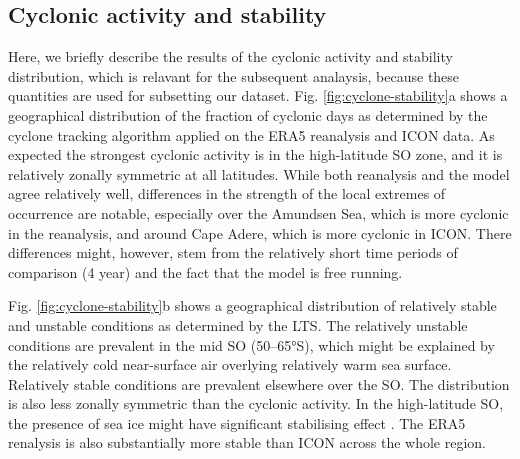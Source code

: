 \documentclass[12pt,a4paper]{article}
\begin{document}
\subsection{Cyclonic activity and stability}

Here, we briefly describe the results of the cyclonic activity and stability
distribution, which is relavant for the subsequent analaysis, because these
quantities are used for subsetting our dataset. Fig.
\ref{fig:cyclone-stability}a shows a geographical distribution of the fraction
of cyclonic days as determined by the cyclone tracking algorithm applied on the
ERA5 reanalysis and ICON data. As expected the strongest cyclonic activity is
in the high-latitude SO zone, and it is relatively zonally symmetric at all
latitudes.  While both reanalysis and the model agree relatively well,
differences in the strength of the local extremes of occurrence are notable,
especially over the Amundsen Sea, which is more cyclonic in the reanalysis, and
around Cape Adere, which is more cyclonic in ICON. There differences might,
however, stem from the relatively short time periods of comparison (4 year) and
the fact that the model is free running.

Fig. \ref{fig:cyclone-stability}b shows a geographical distribution of
relatively stable and unstable conditions as determined by the LTS.  The
relatively unstable conditions are prevalent in the mid SO (50--65°S), which
might be explained by the relatively cold near-surface air overlying relatively
warm sea surface. Relatively stable conditions are prevalent elsewhere over the
SO. The distribution is also less zonally symmetric than the cyclonic activity.
In the high-latitude SO, the presence of sea ice might have significant
stabilising effect \citep{knight2024}. The ERA5 renalysis is also substantially
more stable than ICON across the whole region.
\end{document}
